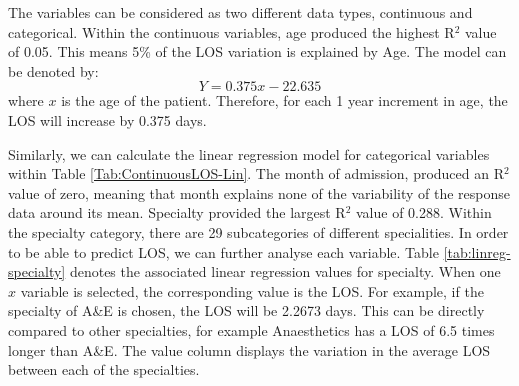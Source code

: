 \documentclass[../thesis.tex]{subfiles}
\begin{document}
The variables can be considered as two different data types, continuous and categorical. Within the continuous variables, age produced the highest R$^{2}$ value of 0.05. This means 5\% of the LOS variation is explained by Age. The model can be denoted by: 
\begin{equation}
    Y = 0.375x - 22.635
\end{equation}
where $x$ is the age of the patient.
Therefore, for each 1 year increment in age, the LOS will increase by 0.375 days.

Similarly, we can calculate the linear regression model for categorical variables within Table \ref{Tab:ContinuousLOS-Lin}. The month of admission, produced an R$^{2}$ value of zero, meaning that month explains none of the variability of the response data around its mean. Specialty provided the largest R$^{2}$ value of 0.288. Within the specialty category, there are 29 subcategories of different specialities. In order to be able to predict LOS, we can further analyse each variable. Table \ref{tab:linreg-specialty} denotes the associated linear regression values for specialty. When one $x$ variable is selected, the corresponding value is the LOS. For example, if the specialty of A\&E is chosen, the LOS will be 2.2673 days. This can be directly compared to other specialties, for example Anaesthetics has a LOS of 6.5 times longer than A\&E. The value column displays the variation in the average LOS between each of the specialties.

\end{document}
